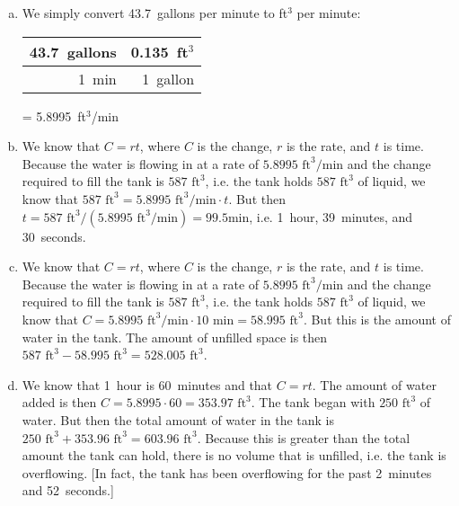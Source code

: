 \documentclass[11pt,letterpaper]{article}
\begin{document}
\sol
\begin{enumerate}[(a)]
\item We simply convert 43.7~gallons per minute to ft$^3$ per minute: \par
	\begin{table}[!ht]
	\centering
	\begin{tabular}{r|r}
	43.7~gallons & 0.135~ft$^3$ \\ \hline
	1~min	     & 1~gallon
	\end{tabular}
	= 5.8995~ft$^3$/min
	\end{table} \pspace

\item We know that $C= rt$, where $C$ is the change, $r$ is the rate, and $t$ is time. Because the water is flowing in at a rate of $5.8995 \text{ ft}^3/\text{min}$ and the change required to fill the tank is $587 \text{ ft}^3$, i.e. the tank holds $587 \text{ ft}^3$ of liquid, we know that $587 \text{ ft}^3= 5.8995 \text{ ft}^3/\text{min} \cdot t$. But then $t= 587 \text{ ft}^3/(5.8995 \text{ ft}^3/\text{min})= 99.5 \text{min}$, i.e. 1~hour, 39~minutes, and 30~seconds. \pspace

\item We know that $C= rt$, where $C$ is the change, $r$ is the rate, and $t$ is time. Because the water is flowing in at a rate of $5.8995 \text{ ft}^3/\text{min}$ and the change required to fill the tank is $587 \text{ ft}^3$, i.e. the tank holds $587 \text{ ft}^3$ of liquid, we know that $C= 5.8995 \text{ ft}^3/\text{min} \cdot 10 \text{ min}= 58.995 \text{ ft}^3$. But this is the amount of water in the tank. The amount of unfilled space is then $587 \text{ ft}^3 - 58.995 \text{ ft}^3= 528.005 \text{ ft}^3$. \pspace

\item We know that 1~hour is 60~minutes and that $C= rt$. The amount of water added is then $C= 5.8995 \cdot 60= 353.97 \text{ ft}^3$. The tank began with $250 \text{ ft}^3$ of water. But then the total amount of water in the tank is $250 \text{ ft}^3 + 353.96 \text{ ft}^3= 603.96 \text{ ft}^3$. Because this is greater than the total amount the tank can hold, there is no volume that is unfilled, i.e. the tank is overflowing. [In fact, the tank has been overflowing for the past 2~minutes and 52~seconds.]
\end{enumerate}



\newpage
\end{document}
